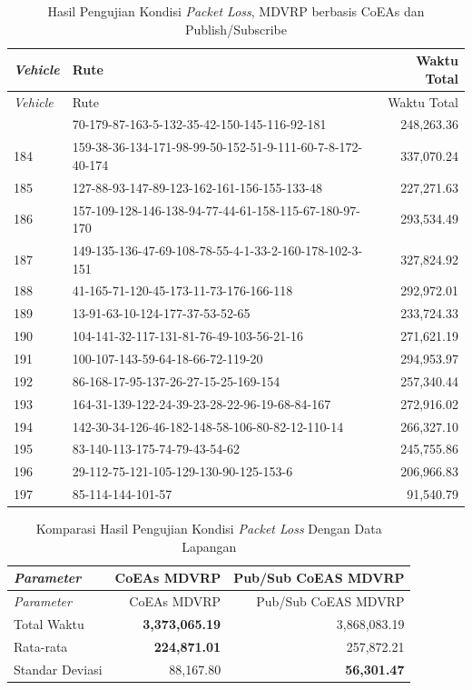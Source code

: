 \begin{longtable}[!]{lp{8cm}r}
	\caption{Hasil Pengujian Kondisi \textit{Packet Loss}, MDVRP berbasis CoEAs dan Publish/Subscribe}
	\label{tbl:test_result_packet_loss_field_pubsub_coes}\\
	\toprule
	\textit{Vehicle} & Rute & Waktu Total\\ 
	\midrule
	\endfirsthead
	\toprule
	\textit{Vehicle} & Rute & Waktu Total\\ 
	\midrule
	\endhead
	\bottomrule
	\endfoot
	183 & 70-179-87-163-5-132-35-42-150-145-116-92-181 & 248,263.36 \\
	184 & 159-38-36-134-171-98-99-50-152-51-9-111-60-7-8-172-40-174 & 337,070.24 \\
	185 & 127-88-93-147-89-123-162-161-156-155-133-48 & 227,271.63 \\
	186 & 157-109-128-146-138-94-77-44-61-158-115-67-180-97-170 & 293,534.49 \\
	187 & 149-135-136-47-69-108-78-55-4-1-33-2-160-178-102-3-151 & 327,824.92 \\
	188 & 41-165-71-120-45-173-11-73-176-166-118 & 292,972.01 \\
	189 & 13-91-63-10-124-177-37-53-52-65 & 233,724.33 \\
	190 & 104-141-32-117-131-81-76-49-103-56-21-16 & 271,621.19 \\
	191 & 100-107-143-59-64-18-66-72-119-20 & 294,953.97 \\
	192 & 86-168-17-95-137-26-27-15-25-169-154 & 257,340.44 \\
	193 & 164-31-139-122-24-39-23-28-22-96-19-68-84-167 & 272,916.02 \\
	194 & 142-30-34-126-46-182-148-58-106-80-82-12-110-14 & 266,327.10 \\
	195 & 83-140-113-175-74-79-43-54-62 & 245,755.86 \\
	196 & 29-112-75-121-105-129-130-90-125-153-6 & 206,966.83 \\
	197 & 85-114-144-101-57 & 91,540.79 \\
\end{longtable}


\begin{longtable}[!]{lrr}
	\caption{Komparasi Hasil Pengujian Kondisi \textit{Packet Loss} Dengan Data Lapangan}
	\label{tbl:test_result_packet_loss_field_comparison}\\
	\toprule
	\textit{Parameter} & CoEAs MDVRP  & Pub/Sub CoEAS MDVRP\\ 
	\midrule
	\endfirsthead
	\toprule
	\textit{Parameter} & CoEAs MDVRP  & Pub/Sub CoEAS MDVRP\\ 
	\midrule
	\endhead
	\bottomrule
	\endfoot
	Total Waktu & \textbf{3,373,065.19} & 3,868,083.19\\
	Rata-rata & \textbf{224,871.01} & 257,872.21\\
	Standar Deviasi & 88,167.80 & \textbf{56,301.47}\\
\end{longtable}


